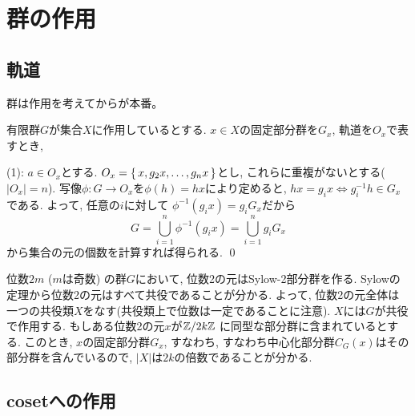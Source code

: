 \section{群の作用}


\subsection{軌道}
群は作用を考えてからが本番。
\begin{prop}
有限群$G$が集合$X$に作用しているとする. $x\in X$の固定部分群を$G_x$, 軌道を$O_x$で表すとき,
\ben
\item {}
\item
\een
\end{prop}
\prf (1): $a\in O_x$とする. $O_x = \set{x,g_2x, \dots, g_n x}$とし, これらに重複がないとする($|O_x| = n$). 写像$\phi:G\to O_x$を$\phi(h) = hx$により定めると, $hx = g_i x\iff g_i^{-1}h \in  G_x$である. よって, 任意の$i$に対して $\phi^{-1}(g_ix) = g_i G_x$だから
\[G = \bigcup_{i=1}^{n} \phi^{-1}(g_i x) = \bigcup_{i=1}^{n}g_iG_x \]
から集合の元の個数を計算すれば得られる. \qed

\begin{eg}
位数$2m$ ($m$は奇数) の群$G$において, 位数2の元はSylow-2部分群を作る. Sylowの定理から位数2の元はすべて共役であることが分かる. よって, 位数2の元全体は一つの共役類$X$をなす(共役類上で位数は一定であることに注意). $X$には$G$が共役で作用する.  もしある位数2の元$x$が$\mathbb{Z}/2k\mathbb{Z}$ に同型な部分群に含まれているとする. このとき, $x$の固定部分群$G_x$, すなわち, すなわち中心化部分群$C_{G}(x)$はその部分群を含んでいるので, $|X|$は$2k$の倍数であることが分かる.
\end{eg}







\subsection{cosetへの作用}

